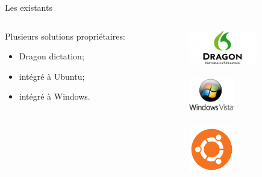 \documentclass{beamer}
\begin{document}
\begin{frame}{Les existants}


	\begin{columns}[c]
	
	\begin{column}{5cm}
		Plusieurs solutions propriétaires:
   		\begin{itemize}
			\item Dragon dictation;
			\item intégré à Ubuntu;
			\item intégré à Windows.
		\end{itemize}
  	\end{column}
	\begin{column}{4cm}
	\begin{center}
		\includegraphics[width=3cm]{dragon}\\ \ \\
		\includegraphics[width=2cm]{ouin}\\ \ \\
		\includegraphics[width=2cm]{bubu}\\
	\end{center}
  	\end{column}
	
	\end{columns}
	
\end{frame}
	
\end{document}
